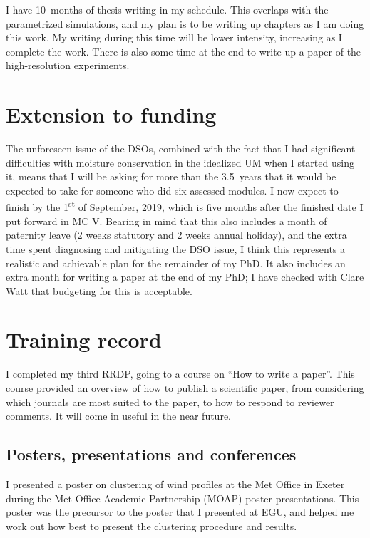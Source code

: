\documentclass[11pt,a4paper]{article}
\newcommand{\ts}{\textsuperscript}
\begin{document}
I have \SI{10}{months} of thesis writing in my schedule. This overlaps with the parametrized simulations, and my plan is to be writing up chapters as I am doing this work. My writing during this time will be lower intensity, increasing as I complete the work. There is also some time at the end to write up a paper of the high-resolution experiments. 

\section{Extension to funding}
\label{sec:extension}

The unforeseen issue of the DSOs, combined with the fact that I had significant difficulties with moisture conservation in the idealized UM when I started using it, means that I will be asking for more than the \SI{3.5}{years} that it would be expected to take for someone who did six assessed modules. 
I now expect to finish by the 1\ts{st} of September, 2019, which is five months after the finished date I put forward in MC V. Bearing in mind that this also includes a month of paternity leave (2 weeks statutory and 2 weeks annual holiday), and the extra time spent diagnosing and mitigating the DSO issue, I think this represents a realistic and achievable plan for the remainder of my PhD. It also includes an extra month for writing a paper at the end of my PhD; I have checked with Clare Watt that budgeting for this is acceptable.

\section{Training record}
\label{sec:Training record}

I completed my third RRDP, going to a course on ``How to write a paper''. This course provided an overview of how to publish a scientific paper, from considering which journals are most suited to the paper, to how to respond to reviewer comments. It will come in useful in the near future.

\subsection{Posters, presentations and conferences}
\label{sec:presentations}

I presented a poster on clustering of wind profiles at the Met Office in Exeter during the Met Office Academic Partnership (MOAP) poster presentations. This poster was the precursor to the poster that I presented at EGU, and helped me work out how best to present the clustering procedure and results.
\end{document}
